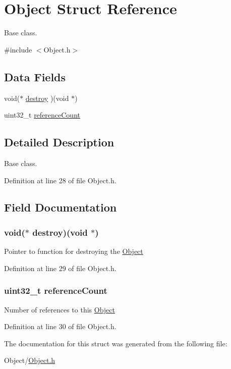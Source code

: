 \hypertarget{struct_m_i_object}{
\section{Object Struct Reference}
\label{struct_m_i_object}
}


Base class.  




{\ttfamily \#include $<$Object.h$>$}

\subsection*{Data Fields}
\begin{DoxyCompactItemize}
\item 
void($\ast$ \hyperlink{struct_m_i_object_aa353725933e843001d4feb03f8268121}{destroy} )(void $\ast$)
\item 
uint32\_\-t \hyperlink{struct_m_i_object_ad83c3d5d3f46e6278a77cb80eb2a0705}{referenceCount}
\end{DoxyCompactItemize}


\subsection{Detailed Description}
Base class. 

Definition at line 28 of file Object.h.



\subsection{Field Documentation}
\hypertarget{struct_m_i_object_aa353725933e843001d4feb03f8268121}{
\subsubsection[{destroy}]{\setlength{\rightskip}{0pt plus 5cm}void($\ast$ {\bf destroy})(void $\ast$)}}
\label{struct_m_i_object_aa353725933e843001d4feb03f8268121}
Pointer to function for destroying the \hyperlink{struct_m_i_object}{Object} 

Definition at line 29 of file Object.h.

\hypertarget{struct_m_i_object_ad83c3d5d3f46e6278a77cb80eb2a0705}{
\subsubsection[{referenceCount}]{\setlength{\rightskip}{0pt plus 5cm}uint32\_\-t {\bf referenceCount}}}
\label{struct_m_i_object_ad83c3d5d3f46e6278a77cb80eb2a0705}
Number of references to this \hyperlink{struct_m_i_object}{Object} 

Definition at line 30 of file Object.h.



The documentation for this struct was generated from the following file:\begin{DoxyCompactItemize}
\item 
Object/\hyperlink{_m_i_object_8h}{Object.h}\end{DoxyCompactItemize}
